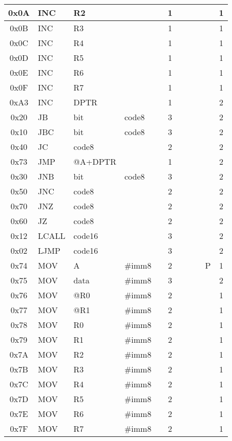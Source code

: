\documentclass[a4paper,twoside,12pt]{book}
\begin{document}
{\begin{longtable}{|c|l|lll|c|llll|c|}
		0x0A	& INC	& R2	&	&	& 1	&	&	&	&	& 1	\\\hline
		0x0B	& INC	& R3	&	&	& 1	&	&	&	&	& 1	\\\hline
		0x0C	& INC	& R4	&	&	& 1	&	&	&	&	& 1	\\\hline
		0x0D	& INC	& R5	&	&	& 1	&	&	&	&	& 1	\\\hline
		0x0E	& INC	& R6	&	&	& 1	&	&	&	&	& 1	\\\hline
		0x0F	& INC	& R7	&	&	& 1	&	&	&	&	& 1	\\\hline
		0xA3	& INC	& DPTR	&	&	& 1	&	&	&	&	& 2	\\\hline
		0x20	& JB	& bit	& code8	&	& 3	&	&	&	&	& 2	\\\hline
		0x10	& JBC	& bit	& code8	&	& 3	&	&	&	&	& 2	\\\hline
		0x40	& JC	& code8	&	&	& 2	&	&	&	&	& 2	\\\hline
		0x73	& JMP	&@A+DPTR&	&	& 1	&	&	&	&	& 2	\\\hline
		0x30	& JNB	& bit	& code8	&	& 3	&	&	&	&	& 2	\\\hline
		0x50	& JNC	& code8	&	&	& 2	&	&	&	&	& 2	\\\hline
		0x70	& JNZ	& code8	&	&	& 2	&	&	&	&	& 2	\\\hline
		0x60	& JZ	& code8	&	&	& 2	&	&	&	&	& 2	\\\hline
		0x12	& LCALL	& code16&	&	& 3	&	&	&	&	& 2	\\\hline
		0x02	& LJMP	& code16&	&	& 3	&	&	&	&	& 2	\\\hline
		0x74	& MOV	& A	& \#imm8&	& 2	&	&	&	& P	& 1	\\\hline
		0x75	& MOV	& data	& \#imm8&	& 3	&	&	&	&	& 2	\\\hline
		0x76	& MOV	& @R0	& \#imm8&	& 2	&	&	&	&	& 1	\\\hline
		0x77	& MOV	& @R1	& \#imm8&	& 2	&	&	&	&	& 1	\\\hline
		0x78	& MOV	& R0	& \#imm8&	& 2	&	&	&	&	& 1	\\\hline
		0x79	& MOV	& R1	& \#imm8&	& 2	&	&	&	&	& 1	\\\hline
		0x7A	& MOV	& R2	& \#imm8&	& 2	&	&	&	&	& 1	\\\hline
		0x7B	& MOV	& R3	& \#imm8&	& 2	&	&	&	&	& 1	\\\hline
		0x7C	& MOV	& R4	& \#imm8&	& 2	&	&	&	&	& 1	\\\hline
		0x7D	& MOV	& R5	& \#imm8&	& 2	&	&	&	&	& 1	\\\hline
		0x7E	& MOV	& R6	& \#imm8&	& 2	&	&	&	&	& 1	\\\hline
		0x7F	& MOV	& R7	& \#imm8&	& 2	&	&	&	&	& 1	\\\hline

\end{longtable}}
\end{document}
